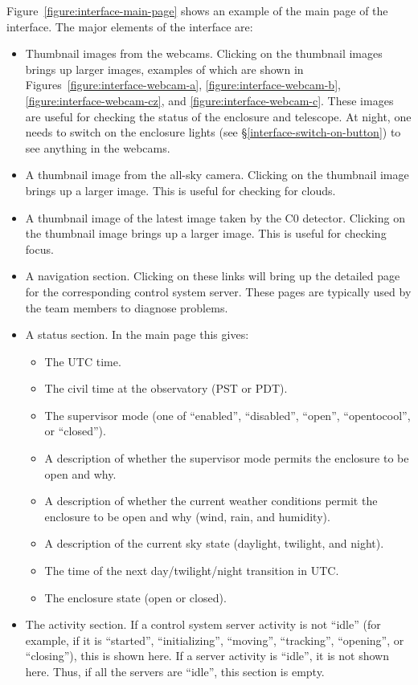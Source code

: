 \fi

Figure~\ref{figure:interface-main-page} shows an example of the main page of the interface. The major elements of the interface are:

\begin{itemize}
    \item
        Thumbnail images from the webcams. Clicking on the thumbnail images brings up larger images, examples of which are shown in Figures~\ref{figure:interface-webcam-a}, \ref{figure:interface-webcam-b}, \ref{figure:interface-webcam-cz}, and \ref{figure:interface-webcam-c}. These images are useful for checking the status of the enclosure and telescope. At night, one needs to switch on the enclosure lights (see \S\ref{interface-switch-on-button}) to see anything in the webcams.
    \item
        A thumbnail image from the all-sky camera. Clicking on the thumbnail image brings up a larger image. This is useful for checking for clouds.
    \item
        A thumbnail image of the latest image taken by the C0 detector. Clicking on the thumbnail image brings up a larger image. This is useful for checking focus.
    \item
        A navigation section. Clicking on these links will bring up the detailed page for the corresponding control system server. These pages are typically used by the team members to diagnose problems.
    \item
        A status section. In the main page this gives:
        \begin{itemize}
            \item
                The UTC time.
            \item
                The civil time at the observatory (PST or PDT).
            \item
                The supervisor mode (one of “enabled”, “disabled”, “open”, “opentocool”, or “closed”).
            \item
                A description of whether the supervisor mode permits the enclosure to be open and why.
            \item
                A description of whether the current weather conditions permit the enclosure to be open and why (wind, rain, and humidity).
            \item
                A description of the current sky state (daylight, twilight, and night).
            \item
                The time of the next day/twilight/night transition in UTC.
            \item
                The enclosure state (open or closed).
        \end{itemize}
    \item
        The activity section. If a control system server activity is not “idle” (for example, if it is “started”, “initializing”, “moving”, “tracking”, “opening”, or “closing”), this is shown here. If a server activity is “idle”, it is not shown here. Thus, if all the servers are “idle”, this section is empty.


\end{itemize}
